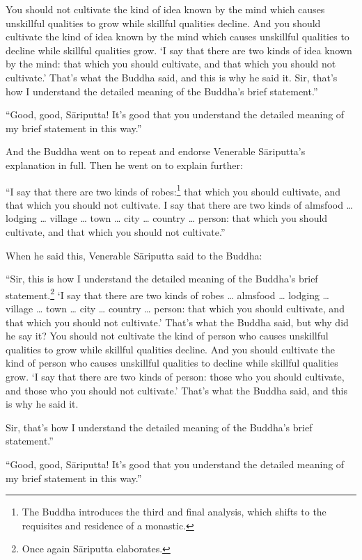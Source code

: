 \documentclass[12pt,openany]{book}%
\begin{document}
You should not cultivate the kind of idea known by the mind which causes unskillful qualities to grow while skillful qualities decline. And you should cultivate the kind of idea known by the mind which causes unskillful qualities to decline while skillful qualities grow. ‘I say that there are two kinds of idea known by the mind: that which you should cultivate, and that which you should not cultivate.’ That’s what the Buddha said, and this is why he said it. Sir, that’s how I understand the detailed meaning of the Buddha’s brief statement.” 

“Good, good, \textsanskrit{Sāriputta}! It’s good that you understand the detailed meaning of my brief statement in this way.” 

And the Buddha went on to repeat and endorse Venerable \textsanskrit{Sāriputta}’s explanation in full. Then he went on to explain further: 

“I say that there are two kinds of robes:\footnote{The Buddha introduces the third and final analysis, which shifts to the requisites and residence of a monastic. } that which you should cultivate, and that which you should not cultivate. I say that there are two kinds of almsfood … lodging … village … town … city … country … person: that which you should cultivate, and that which you should not cultivate.” 

When he said this, Venerable \textsanskrit{Sāriputta} said to the Buddha: 

“Sir, this is how I understand the detailed meaning of the Buddha’s brief statement.\footnote{Once again \textsanskrit{Sāriputta} elaborates. } ‘I say that there are two kinds of robes … almsfood … lodging … village … town … city … country … person: that which you should cultivate, and that which you should not cultivate.’ That’s what the Buddha said, but why did he say it? You should not cultivate the kind of person who causes unskillful qualities to grow while skillful qualities decline. And you should cultivate the kind of person who causes unskillful qualities to decline while skillful qualities grow. ‘I say that there are two kinds of person: those who you should cultivate, and those who you should not cultivate.’ That’s what the Buddha said, and this is why he said it. 

Sir, that’s how I understand the detailed meaning of the Buddha’s brief statement.” 

“Good, good, \textsanskrit{Sāriputta}! It’s good that you understand the detailed meaning of my brief statement in this way.” 
\end{document}
